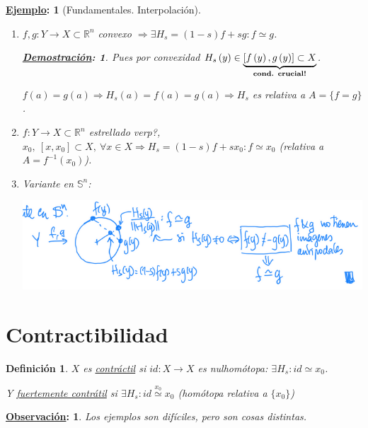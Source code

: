 \documentclass[10pt,a4paper,openright]{book}
\theoremstyle{break}
\newtheorem*{defi}{Definición}
\newtheorem*{demo}{\underline{Demostración}:}
\newtheorem*{obs}{\underline{Observación}:}
\newtheorem*{ej}{\underline{Ejemplo}:}
\begin{document}
\begin{ej}[Fundamentales. Interpolación]
\begin{enumerate}
    \item $f, g: Y \rightarrow X \subset \mathbb{R}^n$ convexo $\Rightarrow\exists H_s = \left( 1 - s \right) f + sg: f \simeq g$.
    \begin{demo}
        Pues por convexidad $H_s\left( y \right) \in \underbrace{\left[ f\left( y \right), g\left( y \right) \right] \subset X}_{\text{\textbf{cond. crucial!}}}$.
    \end{demo}
    $f\left( a \right) = g\left( a \right) \Rightarrow H_s\left( a \right) = f\left( a \right) = g\left( a \right) \Rightarrow H_s$ es relativa a $A = \{f = g\}$.

    \item $f: Y \rightarrow X \subset \mathbb{R}^n$ estrellado verp?, $x_0,\ \left[ x, x_0 \right] \subset X,\ \forall x \in X \Rightarrow H_s = \left( 1 - s \right)f + sx_0: f \simeq x_0$ (relativa a $A = f^{-1}\left( x_0 \right)$).

    \item Variante en $\mathbb{S}^n$:
    \begin{center}
        \includegraphics[scale=0.3]{images/ej_fund_interp_3} 
    \end{center}
\end{enumerate} 
\end{ej}

\section{Contractibilidad}%
\label{sec:contractibilidad}
\begin{defi}
$X$ es \underline{contráctil} si $id: X \rightarrow X$ es nulhomótopa: $\exists H_s : id \simeq x_0$.

Y \underline{fuertemente contrátil} si $\exists H_s : id \stackrel{x_0}{\simeq} x_0$ (homótopa relativa a $\{x_0\}$)
\end{defi}

\begin{obs}
Los ejemplos son difíciles, pero son cosas distintas.
\end{obs}
\end{document}
